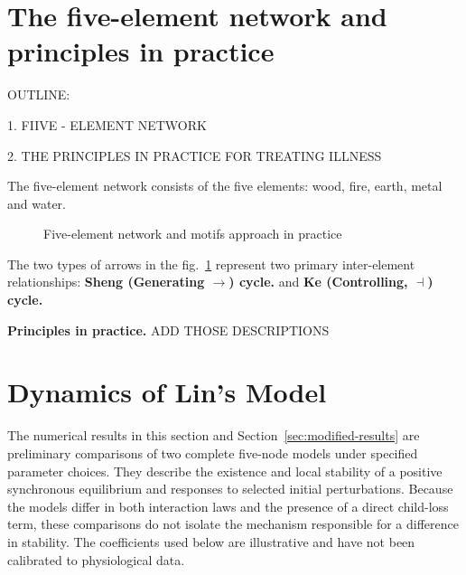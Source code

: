 \documentclass{article}
\begin{document}
\section{The five-element network and principles in practice}

OUTLINE:

1. FIIVE - ELEMENT NETWORK

2. THE PRINCIPLES IN PRACTICE FOR TREATING ILLNESS

The five-element network consists of the five elements: wood, fire, earth, metal and water. 
\begin{figure}[!htb]
\centering
{}

\caption{Five-element network  and motifs approach in practice}
\label{F:WuXing}
\end{figure}
The two types of arrows in the fig.~\ref{F:WuXing} represent two primary inter-element relationships: \textbf{Sheng (Generating $\to $) cycle.} and \textbf{Ke (Controlling, $\dashv$) cycle.}

{\bf Principles in practice.}
ADD THOSE DESCRIPTIONS

\section{Dynamics of Lin's Model}
\label{sec:lin-results}

The numerical results in this section and Section~\ref{sec:modified-results}
are preliminary comparisons of two complete five-node models under specified
parameter choices. They describe the existence and local stability of a
positive synchronous equilibrium and responses to selected initial
perturbations. Because the models differ in both interaction laws and the
presence of a direct child-loss term, these comparisons do not isolate the
mechanism responsible for a difference in stability. The coefficients used
below are illustrative and have not been calibrated to physiological data.
\end{document}
